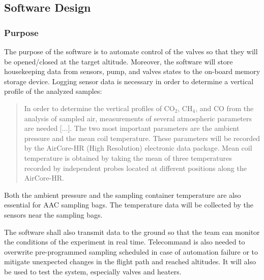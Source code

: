 \pagebreak
\subsection{Software Design}
\subsubsection{Purpose}
The purpose of the software is to automate control of the valves so that they will be opened/closed at the target altitude. Moreover, the software will store housekeeping data from sensors, pump, and valves states to the on-board memory storage device. Logging sensor data is necessary in order to determine a vertical profile of the analyzed samples:

\begin{quote}
In order to determine the vertical profiles of CO$_2$, CH$_4$, and CO from the analysis of sampled air, measurements of several atmospheric parameters are needed [...]. The two most important parameters are the ambient pressure and the mean coil temperature. These parameters will be recorded by the AirCore-HR (High Resolution) electronic data package. Mean coil temperature is obtained by taking the mean of three temperatures recorded by independent probes located at different positions along the AirCore-HR.\cite{Membrive}
\end{quote}

Both the ambient pressure and the sampling container temperature are also essential for AAC sampling bags. The temperature data will be collected by the sensors near the sampling bags.

The software shall also transmit data to the ground so that the team can monitor the conditions of the experiment in real time. Telecommand is also needed to overwrite pre-programmed sampling scheduled in case of automation failure or to mitigate unexpected changes in the flight path and reached altitudes. It will also be used to test the system, especially valves and heaters.\par

